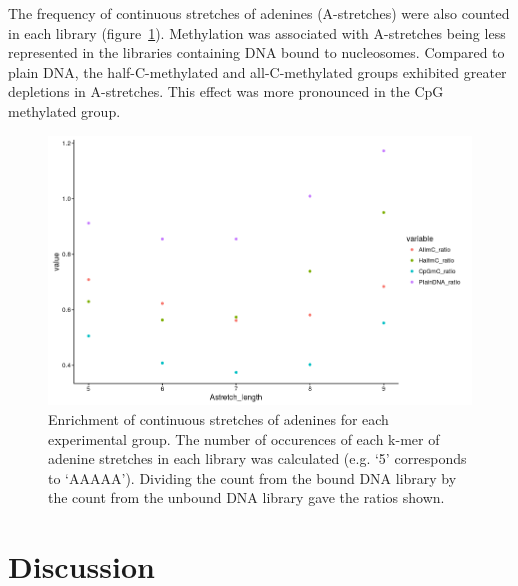 \documentclass[parskip=full, numbers=noenddot]{scrreprt}
\begin{document}
The frequency of continuous stretches of adenines (A-stretches) were also counted in each library (figure~\ref{fig:astretch}).  Methylation was associated with A-stretches being less represented in the libraries containing DNA bound to nucleosomes.  Compared to plain DNA, the half-C-methylated and all-C-methylated groups exhibited greater depletions in A-stretches.  This effect was more pronounced in the CpG methylated group.

\begin{figure}[htpb]
  \centering
  \includegraphics[width=\textwidth]{astretch}
  \caption{Enrichment of continuous stretches of adenines for each experimental group.  The number of occurences of each k-mer of adenine stretches in each library was calculated (e.g. `5' corresponds to `AAAAA').  Dividing the count from the bound DNA library by the count from the unbound DNA library gave the ratios shown.}
  \label{fig:astretch}
\end{figure}

\section{Discussion}
\label{sec:emsaselex_discussion}


\end{document}

